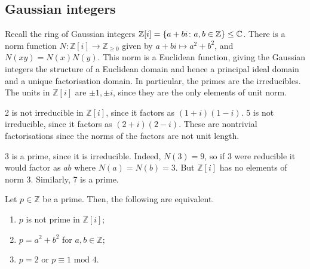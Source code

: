 \subsection{Gaussian integers}
Recall the ring of Gaussian integers \( \mathbb Z[i] = \qty{a+bi \colon a, b \in \mathbb Z} \leq \mathbb C \).
There is a norm function \( N \colon \mathbb Z[i] \to \mathbb Z_{\geq 0} \) given by \( a + bi \mapsto a^2 + b^2 \), and \( N(xy) = N(x) N(y) \).
This norm is a Euclidean function, giving the Gaussian integers the structure of a Euclidean domain and hence a principal ideal domain and a unique factorisation domain.
In particular, the primes are the irreducibles.
The units in \( \mathbb Z[i] \) are \( \pm 1, \pm i \), since they are the only elements of unit norm.
\begin{example}
	2 is not irreducible in \( \mathbb Z[i] \), since it factors as \( (1+i)(1-i) \).
	5 is not irreducible, since it factors as \( (2+i)(2-i) \).
	These are nontrivial factorisations since the norms of the factors are not unit length.

	3 is a prime, since it is irreducible.
	Indeed, \( N(3) = 9 \), so if 3 were reducible it would factor as \( ab \) where \( N(a) = N(b) = 3 \).
	But \( \mathbb Z[i] \) has no elements of norm 3.
	Similarly, 7 is a prime.
\end{example}
\begin{proposition}
	Let \( p \in \mathbb Z \) be a prime.
	Then, the following are equivalent.
	\begin{enumerate}
		\item \( p \) is not prime in \( \mathbb Z[i] \);
		\item \( p = a^2 + b^2 \) for \( a, b \in \mathbb Z \);
		\item \( p = 2 \) or \( p \equiv 1 \text{ mod } 4 \).
	\end{enumerate}
\end{proposition}
